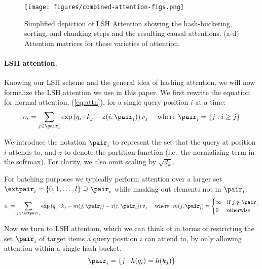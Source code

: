 \begin{figure}
        \centering
        \texttt{[image: figures/combined-attention-figs.png]}
        \caption{Simplified depiction of LSH Attention showing the hash-bucketing, sorting, 
                  and chunking steps and the resulting causal attentions. (a-d) Attention matrices for these varieties of attention.}
        \label{fig:attnpattern}
\end{figure}

\paragraph{LSH attention.}
Knowing our LSH scheme and the general idea of hashing attention, we will now formalize the LSH attention we use in this paper. We first rewrite the equation for normal attention, (\ref{eq:attn}), for a single query position $i$ at a time:
\begin{align}
    &o_i = \sum_{j \in \pair_i} \exp \left(q_i \cdot k_j - z(i, \pair_i) \right) v_j
    &\text{ where } \pair_i = \left\{j : i \geq j \right\}
\end{align}

We introduce the notation $\pair_i$ to represent the set that the query at position $i$ attends to, and $z$ to denote the partition function (i.e.\ the normalizing term in the softmax). For clarity, we also omit scaling by $\sqrt{d_k}$.

For batching purposes we typically perform attention over a larger set $\extpair_i = \{0, 1, \ldots, l\} \supseteq \pair_i$ while masking out elements not in $\pair_i$:
\begin{equation}\label{eq:attn-masked}
    o_i = \sum_{j \in \extpair_i} \exp \left(q_i \cdot k_j - m(j, \pair_i) - z(i, \pair_i) \right) v_j \quad
    \text{ where } \ m(j, \pair_i) = \begin{cases}
    \infty & \text{if } j \notin \pair_i\\
    0 & \text{otherwise}
    \end{cases}
\end{equation}

Now we turn to LSH attention, which we can think of in terms of restricting the set $\pair_i$ of target items a query position $i$ can attend to, by only allowing attention within a single hash bucket.
\begin{equation}
    \pair_i = \left\{ j : h(q_i) = h(k_j) \right\}
\end{equation}

